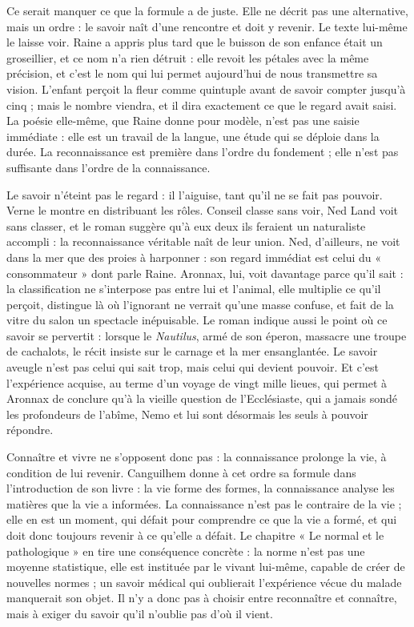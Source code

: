 \documentclass[11pt,a4paper]{article}
\begin{document}
Ce serait manquer ce que la formule a de juste. Elle ne décrit pas une alternative, mais un ordre : le savoir naît d'une rencontre et doit y revenir. Le texte lui-même le laisse voir. Raine a appris plus tard que le buisson de son enfance était un groseillier, et ce nom n'a rien détruit : elle revoit les pétales avec la même précision, et c'est le nom qui lui permet aujourd'hui de nous transmettre sa vision. L'enfant perçoit la fleur comme quintuple avant de savoir compter jusqu'à cinq ; mais le nombre viendra, et il dira exactement ce que le regard avait saisi. La poésie elle-même, que Raine donne pour modèle, n'est pas une saisie immédiate : elle est un travail de la langue, une étude qui se déploie dans la durée. La reconnaissance est première dans l'ordre du fondement ; elle n'est pas suffisante dans l'ordre de la connaissance.

Le savoir n'éteint pas le regard : il l'aiguise, tant qu'il ne se fait pas pouvoir. Verne le montre en distribuant les rôles. Conseil classe sans voir, Ned Land voit sans classer, et le roman suggère qu'à eux deux ils feraient un naturaliste accompli : la reconnaissance véritable naît de leur union. Ned, d'ailleurs, ne voit dans la mer que des proies à harponner : son regard immédiat est celui du « consommateur » dont parle Raine. Aronnax, lui, voit davantage parce qu'il sait : la classification ne s'interpose pas entre lui et l'animal, elle multiplie ce qu'il perçoit, distingue là où l'ignorant ne verrait qu'une masse confuse, et fait de la vitre du salon un spectacle inépuisable. Le roman indique aussi le point où ce savoir se pervertit : lorsque le \emph{Nautilus}, armé de son éperon, massacre une troupe de cachalots, le récit insiste sur le carnage et la mer ensanglantée. Le savoir aveugle n'est pas celui qui sait trop, mais celui qui devient pouvoir. Et c'est l'expérience acquise, au terme d'un voyage de vingt mille lieues, qui permet à Aronnax de conclure qu'à la vieille question de l'Ecclésiaste, qui a jamais sondé les profondeurs de l'abîme, Nemo et lui sont désormais les seuls à pouvoir répondre.

Connaître et vivre ne s'opposent donc pas : la connaissance prolonge la vie, à condition de lui revenir. Canguilhem donne à cet ordre sa formule dans l'introduction de son livre : la vie forme des formes, la connaissance analyse les matières que la vie a informées. La connaissance n'est pas le contraire de la vie ; elle en est un moment, qui défait pour comprendre ce que la vie a formé, et qui doit donc toujours revenir à ce qu'elle a défait. Le chapitre « Le normal et le pathologique » en tire une conséquence concrète : la norme n'est pas une moyenne statistique, elle est instituée par le vivant lui-même, capable de créer de nouvelles normes ; un savoir médical qui oublierait l'expérience vécue du malade manquerait son objet. Il n'y a donc pas à choisir entre reconnaître et connaître, mais à exiger du savoir qu'il n'oublie pas d'où il vient.
\end{document}
